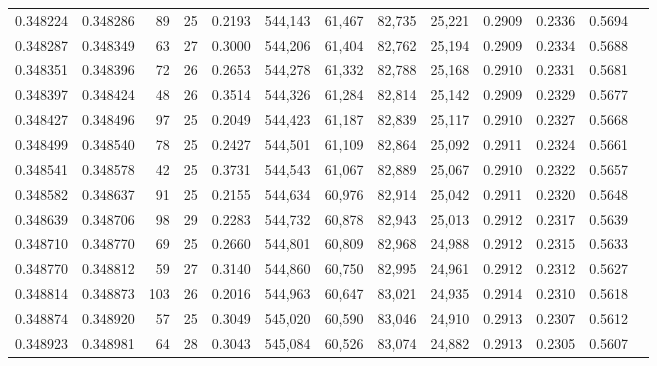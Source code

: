 \begin{tabular}{rrrrrrrrrrrrr}
0.348224 & 0.348286 &    89 &  25 &                                     0.2193 & 544,143 &  61,467 &  82,735 &  25,221 & 0.2909 & 0.2336 & 0.5694 \\
0.348287 & 0.348349 &    63 &  27 &                                     0.3000 & 544,206 &  61,404 &  82,762 &  25,194 & 0.2909 & 0.2334 & 0.5688 \\
0.348351 & 0.348396 &    72 &  26 &                                     0.2653 & 544,278 &  61,332 &  82,788 &  25,168 & 0.2910 & 0.2331 & 0.5681 \\
0.348397 & 0.348424 &    48 &  26 &                                     0.3514 & 544,326 &  61,284 &  82,814 &  25,142 & 0.2909 & 0.2329 & 0.5677 \\
0.348427 & 0.348496 &    97 &  25 &                                     0.2049 & 544,423 &  61,187 &  82,839 &  25,117 & 0.2910 & 0.2327 & 0.5668 \\
0.348499 & 0.348540 &    78 &  25 &                                     0.2427 & 544,501 &  61,109 &  82,864 &  25,092 & 0.2911 & 0.2324 & 0.5661 \\
0.348541 & 0.348578 &    42 &  25 &                                     0.3731 & 544,543 &  61,067 &  82,889 &  25,067 & 0.2910 & 0.2322 & 0.5657 \\
0.348582 & 0.348637 &    91 &  25 &                                     0.2155 & 544,634 &  60,976 &  82,914 &  25,042 & 0.2911 & 0.2320 & 0.5648 \\
0.348639 & 0.348706 &    98 &  29 &                                     0.2283 & 544,732 &  60,878 &  82,943 &  25,013 & 0.2912 & 0.2317 & 0.5639 \\
0.348710 & 0.348770 &    69 &  25 &                                     0.2660 & 544,801 &  60,809 &  82,968 &  24,988 & 0.2912 & 0.2315 & 0.5633 \\
0.348770 & 0.348812 &    59 &  27 &                                     0.3140 & 544,860 &  60,750 &  82,995 &  24,961 & 0.2912 & 0.2312 & 0.5627 \\
0.348814 & 0.348873 &   103 &  26 &                                     0.2016 & 544,963 &  60,647 &  83,021 &  24,935 & 0.2914 & 0.2310 & 0.5618 \\
0.348874 & 0.348920 &    57 &  25 &                                     0.3049 & 545,020 &  60,590 &  83,046 &  24,910 & 0.2913 & 0.2307 & 0.5612 \\
0.348923 & 0.348981 &    64 &  28 &                                     0.3043 & 545,084 &  60,526 &  83,074 &  24,882 & 0.2913 & 0.2305 & 0.5607 \\

\end{tabular}
